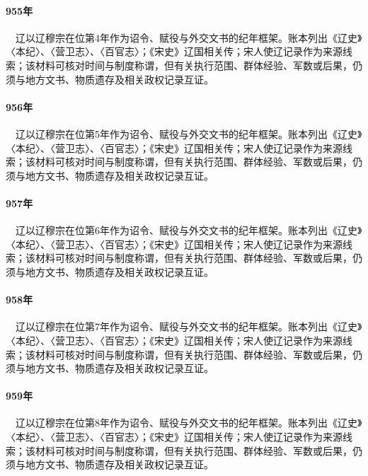 \paragraph{955年}　辽以辽穆宗在位第4年作为诏令、赋役与外交文书的纪年框架。账本列出《辽史》〈本纪〉、〈营卫志〉、〈百官志〉；《宋史》辽国相关传；宋人使辽记录作为来源线索；该材料可核对时间与制度称谓，但有关执行范围、群体经验、军数或后果，仍须与地方文书、物质遗存及相关政权记录互证。

\paragraph{956年}　辽以辽穆宗在位第5年作为诏令、赋役与外交文书的纪年框架。账本列出《辽史》〈本纪〉、〈营卫志〉、〈百官志〉；《宋史》辽国相关传；宋人使辽记录作为来源线索；该材料可核对时间与制度称谓，但有关执行范围、群体经验、军数或后果，仍须与地方文书、物质遗存及相关政权记录互证。

\paragraph{957年}　辽以辽穆宗在位第6年作为诏令、赋役与外交文书的纪年框架。账本列出《辽史》〈本纪〉、〈营卫志〉、〈百官志〉；《宋史》辽国相关传；宋人使辽记录作为来源线索；该材料可核对时间与制度称谓，但有关执行范围、群体经验、军数或后果，仍须与地方文书、物质遗存及相关政权记录互证。

\paragraph{958年}　辽以辽穆宗在位第7年作为诏令、赋役与外交文书的纪年框架。账本列出《辽史》〈本纪〉、〈营卫志〉、〈百官志〉；《宋史》辽国相关传；宋人使辽记录作为来源线索；该材料可核对时间与制度称谓，但有关执行范围、群体经验、军数或后果，仍须与地方文书、物质遗存及相关政权记录互证。

\paragraph{959年}　辽以辽穆宗在位第8年作为诏令、赋役与外交文书的纪年框架。账本列出《辽史》〈本纪〉、〈营卫志〉、〈百官志〉；《宋史》辽国相关传；宋人使辽记录作为来源线索；该材料可核对时间与制度称谓，但有关执行范围、群体经验、军数或后果，仍须与地方文书、物质遗存及相关政权记录互证。

